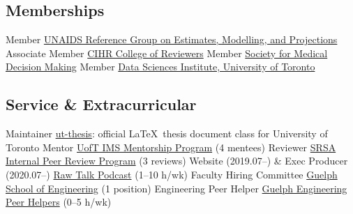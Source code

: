 \subsection{Memberships}
  {Member}
  {\href{https://epidem.org}{UNAIDS Reference Group on Estimates, Modelling, and Projections}}
  {Associate Member}
  {\href{https://cihr-irsc.gc.ca/e/47382.html}{CIHR College of Reviewers}}
  {Member}
  {\href{https://smdm.org/}{Society for Medical Decision Making}}
  {Member}
  {\href{https://datasciences.utoronto.ca/}{Data Sciences Institute, University of Toronto}}
\subsection{Service \& Extracurricular}
  {Maintainer}
  {\href{https://www.ctan.org/pkg/ut-thesis}{ut-thesis}: official \LaTeX\ thesis document class for University of Toronto}
  {Mentor} %
  {\href{https://ims.utoronto.ca/ims-p2p-mentorship}{UofT IMS Mentorship Program} (4 mentees)}
  {Reviewer} %
  {\href{https://research.unityhealth.to/future-students-trainees/st-michaels-hospital-research-student-association}{SRSA Internal Peer Review Program} (3 reviews)}
  {Website \textnormal{(2019.07--)} \& Exec Producer \textnormal{(2020.07--)}}
  {\href{https://www.rawtalkpodcast.com}{Raw Talk Podcast} (1--10 h/wk)}
  {Faculty Hiring Committee}
  {\href{https://www.uoguelph.ca/engineering}{Guelph School of Engineering} (1 position)}
  {Engineering Peer Helper}
  {\href{https://www.uoguelph.ca/engineering/content/current/peer-helper}{Guelph Engineering Peer Helpers} (0--5 h/wk)}
